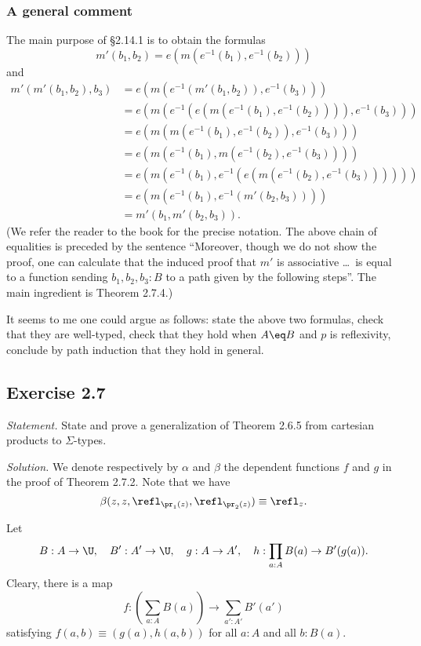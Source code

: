 \documentclass[12pt]{article}
\begin{document}
\subsubsection{A general comment}

The main purpose of \S2.14.1 is to obtain the formulas
$$
m'(b_1,b_2)=e(m(e^{-1}(b_1),e^{-1}(b_2)))
$$ 
and
\begin{equation*}
  \begin{aligned}
    m'(m'(b_1,b_2),b_3)
    &= e(m(e^{-1}(m'(b_1,b_2)),e^{-1}(b_3))) \\
    &= e(m(e^{-1}(e(m(e^{-1}(b_1),e^{-1}(b_2)))),e^{-1}(b_3))) \\
    &= e(m(m(e^{-1}(b_1),e^{-1}(b_2)),e^{-1}(b_3))) \\
    &= e(m(e^{-1}(b_1),m(e^{-1}(b_2),e^{-1}(b_3)))) \\
    &= e(m(e^{-1}(b_1),e^{-1}(e(m(e^{-1}(b_2),e^{-1}(b_3)))))) \\
    &= e(m(e^{-1}(b_1),e^{-1}(m'(b_2,b_3)))) \\
    &= m'(b_1,m'(b_2,b_3)).
\end{aligned}
\end{equation*}
(We refer the reader to the book for the precise notation. The above chain of equalities is preceded by the sentence ``Moreover, though we do not show the proof, one can calculate that the induced proof that $m'$ is associative \dots\ is equal to a function sending $b_1,b_2,b_3:B$ to a path given by the following steps''. The main ingredient is Theorem 2.7.4.)

It seems to me one could argue as follows: state the above two formulas, check that they are well-typed, check that they hold when $A\eq B$ and $p$ is reflexivity, conclude by path induction that they hold in general.


\subsection{Exercise 2.7}

\emph{Statement.} State and prove a generalization of Theorem 2.6.5 from cartesian products to $\Sigma$-types. 

\nn\emph{Solution.} We denote respectively by $\alpha$ and $\beta$ the dependent functions $f$ and $g$ in the proof of Theorem 2.7.2. Note that we have 
$$
\beta(z,z,\refl_{\pr_1(z)},\refl_{\pr_2(z)})\equiv\refl_z.
$$

Let 
$$
B:A\to\U,\quad B':A'\to\U,\quad g:A\to A',\quad h:\prod_{a:A}B(a)\to B'(g(a)).
$$ 
Cleary, there is a map 
$$
f:\left(\sum_{a:A}B(a)\right)\to\sum_{a':A'}B'(a')
$$ 
satisfying $f(a,b)\equiv (g(a),h(a,b))$ for all $a:A$ and all $b:B(a)$. 
\end{document}

